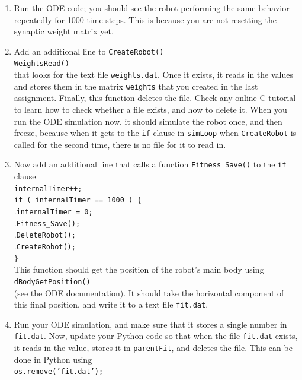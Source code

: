 \documentclass[12pt]{article}
\begin{document}
\begin{enumerate}
\item Run the ODE code; you should see the robot performing the same behavior repeatedly for 1000 time steps. This is because you are not resetting the synaptic weight matrix yet.

\item Add an additional line to \texttt{CreateRobot()}\\
\texttt{WeightsRead()}\\
that looks for the text file \texttt{weights.dat}. Once it exists, it reads in the values and stores them in the matrix \texttt{weights} that you created in the last assignment. Finally, this function deletes the file. Check any online C tutorial to learn how to check whether a file exists, and how to delete it. When you run the ODE simulation now, it should simulate the robot once, and then freeze, because when it gets to the \texttt{if} clause in \texttt{simLoop} when \texttt{CreateRobot} is called for the second time, there is no file for it to read in.

\item Now add an additional line that calls a function \texttt{Fitness\_Save()} to the \texttt{if} clause \\
   \texttt{internalTimer++;}\\
   \texttt{if ( internalTimer == 1000 ) \{}\\
.\hspace{0.5cm}\texttt{internalTimer = 0;}\\
.\hspace{0.5cm}\texttt{Fitness\_Save();}\\
.\hspace{0.5cm}\texttt{DeleteRobot();}\\
.\hspace{0.5cm}\texttt{CreateRobot();}\\
   \texttt{\}}\\
This function should get the position of the robot's main body using \\
\texttt{dBodyGetPosition()}\\
(see the ODE documentation). It should take the horizontal component of this final position, and write it to a text file \texttt{fit.dat}.

\item Run your ODE simulation, and make sure that it stores a single number in \texttt{fit.dat}. Now, update your Python code so that when the file \texttt{fit.dat} exists, it reads in the value, stores it in \texttt{parentFit}, and deletes the file. This can be done in Python using \\
\texttt{os.remove('fit.dat');}


\end{enumerate}
\end{document}
